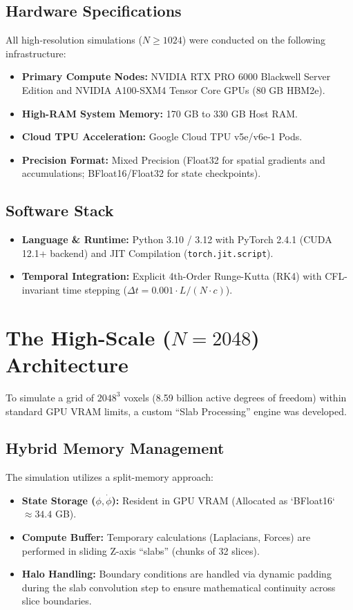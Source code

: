 \documentclass[11pt, twoside]{article}
\begin{document}
\subsection{Hardware Specifications}
All high-resolution simulations ($N \ge 1024$) were conducted on the following infrastructure:
\begin{itemize}
    \item \textbf{Primary Compute Nodes:} NVIDIA RTX PRO 6000 Blackwell Server Edition and NVIDIA A100-SXM4 Tensor Core GPUs (80 GB HBM2e).
    \item \textbf{High-RAM System Memory:} 170 GB to 330 GB Host RAM.
    \item \textbf{Cloud TPU Acceleration:} Google Cloud TPU v5e/v6e-1 Pods.
    \item \textbf{Precision Format:} Mixed Precision (Float32 for spatial gradients and accumulations; BFloat16/Float32 for state checkpoints).
\end{itemize}

\subsection{Software Stack}
\begin{itemize}
    \item \textbf{Language \& Runtime:} Python 3.10 / 3.12 with PyTorch 2.4.1 (CUDA 12.1+ backend) and JIT Compilation (\texttt{torch.jit.script}).
    \item \textbf{Temporal Integration:} Explicit 4th-Order Runge-Kutta (RK4) with CFL-invariant time stepping ($\Delta t = 0.001 \cdot L / (N \cdot c)$).
\end{itemize}

\section{The High-Scale ($N=2048$) Architecture}
To simulate a grid of $2048^3$ voxels (8.59 billion active degrees of freedom) within standard GPU VRAM limits, a custom ``Slab Processing'' engine was developed.

\subsection{Hybrid Memory Management}
The simulation utilizes a split-memory approach:
\begin{itemize}
    \item \textbf{State Storage ($\phi, \dot{\phi}$):} Resident in GPU VRAM (Allocated as `BFloat16` $\approx 34.4$ GB).
    \item \textbf{Compute Buffer:} Temporary calculations (Laplacians, Forces) are performed in sliding Z-axis ``slabs'' (chunks of 32 slices).
    \item \textbf{Halo Handling:} Boundary conditions are handled via dynamic padding during the slab convolution step to ensure mathematical continuity across slice boundaries.
\end{itemize}
\end{document}
